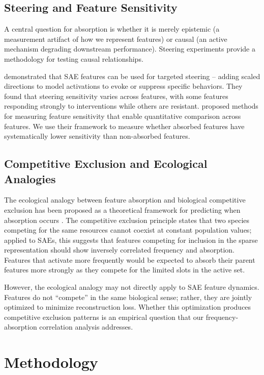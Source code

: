 \documentclass{article}
\begin{document}
\subsection{Steering and Feature Sensitivity}

A central question for absorption is whether it is merely epistemic (a measurement artifact of how we represent features) or causal (an active mechanism degrading downstream performance). Steering experiments provide a methodology for testing causal relationships.

\citet{o_brien2024} demonstrated that SAE features can be used for targeted steering -- adding scaled directions to model activations to evoke or suppress specific behaviors. They found that steering sensitivity varies across features, with some features responding strongly to interventions while others are resistant. \citet{tian2025} proposed methods for measuring feature sensitivity that enable quantitative comparison across features. We use their framework to measure whether absorbed features have systematically lower sensitivity than non-absorbed features.

\subsection{Competitive Exclusion and Ecological Analogies}

The ecological analogy between feature absorption and biological competitive exclusion has been proposed as a theoretical framework for predicting when absorption occurs \citep{korznikov2025, kalmykov2012}. The competitive exclusion principle states that two species competing for the same resources cannot coexist at constant population values; applied to SAEs, this suggests that features competing for inclusion in the sparse representation should show inversely correlated frequency and absorption. Features that activate more frequently would be expected to absorb their parent features more strongly as they compete for the limited slots in the active set.

However, the ecological analogy may not directly apply to SAE feature dynamics. Features do not ``compete'' in the same biological sense; rather, they are jointly optimized to minimize reconstruction loss. Whether this optimization produces competitive exclusion patterns is an empirical question that our frequency-absorption correlation analysis addresses.


\section{Methodology}
\end{document}

